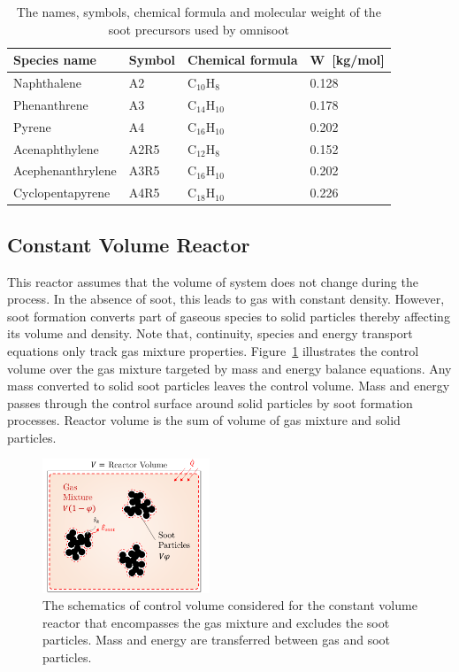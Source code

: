 \begin{enumerate}
\begin{table}
	\caption{The names, symbols, chemical formula and molecular weight of the soot precursors used by omnisoot}
	\label{tab:precursors_list}
	\centering
	\begin{tabular}{l l l l}
		\hline
		Species name & Symbol & Chemical formula & W~[kg/mol] \\
		\hline
		Naphthalene       & A2   &  $\mathrm{C_{10}H_{8}}$   & 0.128 \\
		Phenanthrene      & A3   &  $\mathrm{C_{14}H_{10}}$  & 0.178 \\
		Pyrene            & A4   &  $\mathrm{C_{16}H_{10}}$  & 0.202 \\
		Acenaphthylene    & A2R5 &  $\mathrm{C_{12}H_{8}}$   & 0.152 \\
		Acephenanthrylene & A3R5 &  $\mathrm{C_{16}H_{10}}$  & 0.202 \\
		Cyclopentapyrene  & A4R5 &  $\mathrm{C_{18}H_{10}}$  & 0.226 \\
		\hline
	\end{tabular}
\end{table}

\end{enumerate}


\subsection{Constant Volume Reactor}
This reactor assumes that the volume of system does not change during the process. In the absence of soot, this leads to gas with constant density. However, soot formation converts part of gaseous species to solid particles thereby affecting its volume and density. Note that, continuity, species and energy transport equations only track gas mixture properties. Figure~\ref{fig:constuvcv} illustrates the control volume over the gas mixture targeted by mass and energy balance equations. Any mass converted to solid soot particles leaves the control volume. Mass and energy passes through the control surface around solid particles by soot formation processes. Reactor volume is the sum of volume of gas mixture and solid particles.

\begin{figure}[!htbp]
	\centering
	\includegraphics[height=40mm, ]{Figures/Theory/ConstUV.pdf}
	\caption{The schematics of control volume considered for the constant volume reactor that encompasses the gas mixture and excludes the soot particles. Mass and energy are transferred between gas and soot particles.}
	\label{fig:constuvcv}
\end{figure}
 
